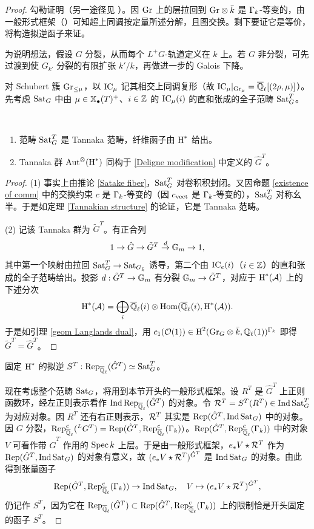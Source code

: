 \begin{proof}
勾勒证明（另一途径见 \cite[\S~5]{Ri}）。因 $\Gr$ 上的层拉回到 $\Gr\otimes \bar k$ 是 $\Ga_k$-等变的，由一般形式框架（\cite[Lemma A.3]{RZ}）可知超上同调按定量所述分解，且图交换。剩下要证它是等价，将构造拟逆函子来证。

为说明想法，假设 $G$ 分裂，从而每个 $L^+G$-轨道定义在 $k$ 上。若 $G$ 非分裂，可先过渡到使 $G_{k'}$ 分裂的有限扩张 $k'/k$，再做进一步的 Galois 下降。

对 Schubert 簇 $\Gr_{\leq \mu}$，以 $\IC_\mu$ 记其相交上同调复形（故 $\IC_\mu|_{\Gr_\mu}=\Ql[(2\rho,\mu)]$）。先考虑 $\Sat_G$ 中由 $\mu\in \xcoch(T)^+$、$i\in \bZ$ 的 $\IC_\mu(i)$ 的直和张成的全子范畴 $\Sat_G^T$。

\begin{lem}~
\begin{enumerate}
\item 范畴 $\Sat_G^T$ 是 Tannaka 范畴，纤维函子由 $\on{H}^*$ 给出。
\item Tannaka 群 $\Aut^{\otimes}(\on{H}^*)$ 同构于 \eqref{Deligne modification} 中定义的 $\hat G^T$。
\end{enumerate}
\end{lem}

\begin{proof}
(1) 事实上由推论 \ref{Satake fiber}，$\Sat_G^T$ 对卷积积封闭。又因命题 \ref{existence of comm} 中的交换约束 $c$ 是 $\Ga_k$-等变的（因 $c_{\on{vect}}$ 是 $\Ga_k$-等变的），$\Sat_G^T$ 对称幺半。于是如定理 \ref{Tannakian structure} 的论证，它是 Tannaka 范畴。

(2) 记该 Tannaka 群为 $\tilde G^T$。有正合列
\[1\to \hat G\to \tilde G^T\stackrel{d}{\to} \bG_m\to 1,\]
其中第一个映射由拉回 $\Sat_G^T\to \Sat_{G_{\bar k}}$ 诱导，第二个由 $\IC_e(i)$（$i\in\bZ$）的直和张成的全子范畴给出。投影 $d:\tilde G^T\to \bG_m$ 有分裂 $\bG_m\to \tilde G^T$，对应于 $\on{H}^*(\mA)$ 上的下述分次
\[\on{H}^*(\mA)=\bigoplus_i \Ql(i)\otimes \Hom(\Ql(i), \on{H}^*(\mA)).\]
于是如引理 \ref{geom Langlands dual}，用 $c_1(\mO(1))\in \on{H}^2(\Gr_G\otimes\bar k,\bQ_\ell(1))^{\Ga_k}$ 即得 $\tilde G^T=\hat G^T$。
\end{proof}

固定 $\on{H}^*$ 的拟逆 $S^T: \Rep_\Ql(\hat G^T)\simeq \Sat_G^T$。

现在考虑整个范畴 $\Sat_G$，将用到本节开头的一般形式框架。设 $R^T$ 是 $\hat G^T$ 上正则函数环，经左正则表示看作 $\on{Ind}\on{Rep}_{\Ql}(\hat G^T)$ 的对象。令 $\mR^T=S^T(R^T)\in \on{Ind}\Sat^T_G$ 为对应对象。因 $R^T$ 还有右正则表示，$\mR^T$ 其实是 $\on{Rep}(\hat G^T,{\on{Ind}\Sat_G})$ 中的对象。因 $G$ 分裂，$\Rep^c_\Ql({^L}G^T)=\on{Rep}(\hat G^T,{\on{Rep}^c_{\Ql}(\Ga_k)})$。$\on{Rep}(\hat G^T,{\on{Rep}^c_{\Ql}(\Ga_k)})$ 中的对象 $V$ 可看作带 $\hat G^T$ 作用的 $\Spec k$ 上层。于是由一般形式框架，$e_*V\star\mR^T$ 作为 $\Rep(\hat G^T, \on{Ind}\Sat_G)$ 的对象有意义，故 $(e_*V\star \mR^T)^{\hat G^T}$ 是 $\on{Ind}\Sat_G$ 的对象。由此得到张量函子
\[\on{Rep}(\hat G^T,{\on{Rep}^c_{\Ql}(\Ga_k)})\to \on{Ind}\Sat_G,\quad V\mapsto (e_*V\star \mR^T)^{\hat G^T},\]
仍记作 $S^T$，因为它在 $\Rep_\Ql(\hat G^T)\subset \on{Rep}(\hat G^T,{\on{Rep}^c_{\Ql}(\Ga_k)})$ 上的限制恰是开头固定的函子 $S^T$。


\end{proof}

